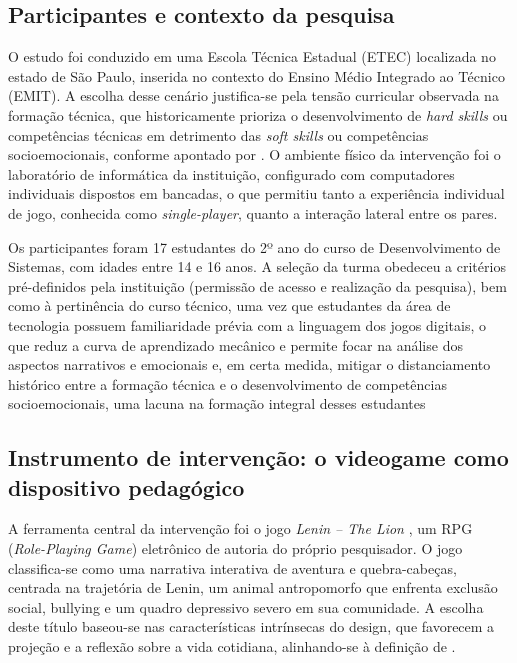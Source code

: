 \documentclass[portuguese]{textolivre}
\begin{document}
\subsection{Participantes e contexto da pesquisa}

O estudo foi conduzido em uma Escola Técnica Estadual (ETEC) localizada no estado de São Paulo, inserida no contexto do Ensino Médio Integrado ao Técnico (EMIT). A escolha desse cenário justifica-se pela tensão curricular observada na formação técnica, que historicamente prioriza o desenvolvimento de \textit{hard skills} ou competências técnicas em detrimento das \textit{soft skills} ou competências socioemocionais, conforme apontado por \textcite{silvaneto2024corpo,hildebrando2022competencias}. O ambiente físico da intervenção foi o laboratório de informática da instituição, configurado com computadores individuais dispostos em bancadas, o que permitiu tanto a experiência individual de jogo, conhecida como \textit{single-player}, quanto a interação lateral entre os pares.

Os participantes foram 17 estudantes do 2º ano do curso de Desenvolvimento de Sistemas, com idades entre 14 e 16 anos. A seleção da turma obedeceu a critérios pré-definidos pela instituição (permissão de acesso e realização da pesquisa), bem como à pertinência do curso técnico, uma vez que estudantes da área de tecnologia possuem familiaridade prévia com a linguagem dos jogos digitais, o que reduz a curva de aprendizado mecânico e permite focar na análise dos aspectos narrativos e emocionais e, em certa medida, mitigar o distanciamento histórico entre a formação técnica e o desenvolvimento de competências socioemocionais, uma lacuna na formação integral desses estudantes \cite{silvaneto2024corpo}
 
\subsection{Instrumento de intervenção: o videogame como dispositivo pedagógico}


A ferramenta central da intervenção foi o jogo \textit{Lenin – The Lion} \cite{bueno2019lenin}, um RPG (\textit{Role-Playing Game}) eletrônico de autoria do próprio pesquisador. O jogo classifica-se como uma narrativa interativa de aventura e quebra-cabeças, centrada na trajetória de Lenin, um animal antropomorfo que enfrenta exclusão social, bullying e um quadro depressivo severo em sua comunidade. A escolha deste título baseou-se nas características intrínsecas do design, que favorecem a projeção e a reflexão sobre a vida cotidiana, alinhando-se à definição de \textcite{crawford1984art}.
\end{document}
